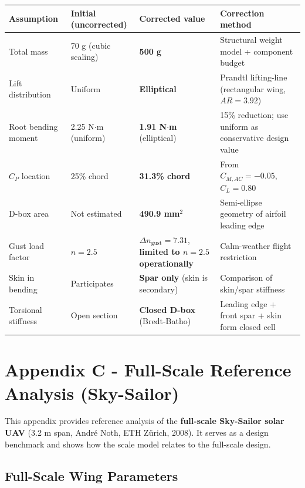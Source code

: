 \documentclass[10pt,a4paper]{article}
\begin{document}
\begin{center}
\renewcommand{\arraystretch}{1.2}
\begin{tabularx}{\textwidth}{|p{3cm}|p{3cm}|p{3.5cm}|X|}
\hline
Assumption & Initial (uncorrected) & Corrected value & Correction method \\
\hline
Total mass & 70 g (cubic scaling) & \textbf{500 g} & Structural weight model + component budget \\
\hline
Lift distribution & Uniform & \textbf{Elliptical} & Prandtl lifting-line (rectangular wing, $AR = 3.92$) \\
\hline
Root bending moment & 2.25 N$\cdot$m (uniform) & \textbf{1.91 N$\cdot$m} (elliptical) & 15\% reduction; use uniform as conservative design value \\
\hline
$C_P$ location & 25\% chord & \textbf{31.3\% chord} & From $C_{M,AC} = -0.05$, $C_L = 0.80$ \\
\hline
D-box area & Not estimated & \textbf{490.9 mm$^{2}$} & Semi-ellipse geometry of airfoil leading edge \\
\hline
Gust load factor & $n = 2.5$ & $\Delta n_{\text{gust}} = 7.31$, \textbf{limited to $n = 2.5$ operationally} & Calm-weather flight restriction \\
\hline
Skin in bending & Participates & \textbf{Spar only} (skin is secondary) & Comparison of skin/spar stiffness \\
\hline
Torsional stiffness & Open section & \textbf{Closed D-box} (Bredt-Batho) & Leading edge + front spar + skin form closed cell \\
\hline
\end{tabularx}
\end{center}

\newpage \section{Appendix C - Full-Scale Reference Analysis (Sky-Sailor)}

This appendix provides reference analysis of the \textbf{full-scale Sky-Sailor solar UAV} (3.2 m span, André Noth, ETH Zürich, 2008). It serves as a design benchmark and shows how the scale model relates to the full-scale design.


\subsection{Full-Scale Wing Parameters}
\end{document}
